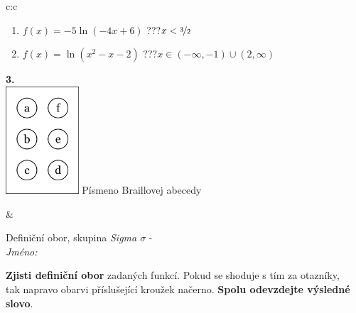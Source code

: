 \documentclass[10pt]{report}
\begin{document}
\begin{tabular}{c:c}
\begin{minipage}[c][104.5mm][t]{0.5\linewidth}
\begin{center}
\begin{minipage}{0.79\linewidth}
\begin{center}
\begin{varwidth}{\linewidth}
\begin{enumerate}
\item $f(x)=-5\ln{(-4x+6)}$\quad \dotfill\; ???\;\dotfill \quad $x<\nicefrac{3}{2}$
\item $f(x)=\ln{(x^2-x-2)}$\quad \dotfill\; ???\;\dotfill \quad $x\in(-\infty , -1)\cup(2 , \infty)$
\end{enumerate}
\end{varwidth}
\end{center}
\end{minipage}
\begin{minipage}{0.20\linewidth}
\begin{center}
{\Huge\bfseries 3.} \\[2mm]
\includegraphics[height=40mm]{../images/braille.png}
{\small Písmeno Braillovej abecedy}
\end{center}
\end{minipage}
\end{center}
\end{minipage}
&
\begin{minipage}[c][104.5mm][t]{0.5\linewidth}
\begin{center}
\vspace{7mm}
{\huge Definiční obor, skupina \textit{Sigma $\sigma$} -}\\[5mm]
\textit{Jméno:}\phantom{xxxxxxxxxxxxxxxxxxxxxxxxxxxxxxxxxxxxxxxxxxxxxxxxxxxxxxxxxxxxxxxxx}\\[5mm]
\begin{minipage}{0.95\linewidth}
\begin{center}
\textbf{Zjisti definiční obor} zadaných funkcí. Pokud se shoduje s tím za otazníky,\\tak napravo obarvi příslušející kroužek načerno. \textbf{Spolu odevzdejte výsledné slovo}.
\end{center}
\end{minipage}
\\[1mm]
\begin{minipage}{0.79\linewidth}
\begin{center}
\begin{varwidth}{\linewidth}
\begin{enumerate}

\end{enumerate}
\end{varwidth}
\end{center}
\end{minipage}
\end{center}
\end{minipage}
\end{tabular}
\end{document}

